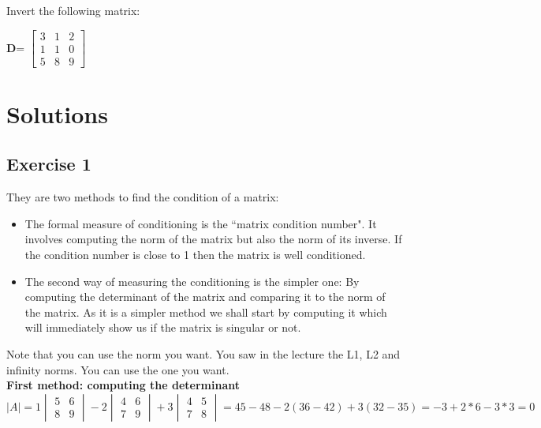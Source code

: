 \documentclass[12pt]{article}
\newenvironment{exercise}[2][Exercise]{\begin{trivlist}
\item[\hskip \labelsep {\bfseries #1}\hskip \labelsep {\bfseries #2.}]}{\end{trivlist}}
\begin{document}
\begin{exercise}{3} %
Invert the following matrix:
\begin{center}
\textbf{D}=
$\begin{bmatrix}
3&1&2\\
1&1&0\\
5&8&9
\end{bmatrix}
$
\end{center}
\end{exercise}

\break

\section{Solutions}

\subsection{Exercise 1}

They are two methods to find the condition of a matrix:
\begin{itemize}
  \item The formal measure of conditioning is the ``matrix condition number". It involves computing the norm of the matrix but also the norm of its inverse. If the condition number is close to 1 then the matrix is well conditioned.
  \item The second way of measuring the conditioning is the simpler one: By computing the determinant of the matrix and comparing it to the norm of the matrix. As it is a simpler method we shall start by computing it which will immediately show us if the matrix is singular or not.
\end{itemize}
Note that you can use the norm you want. You saw in the lecture the L1, L2 and infinity norms. You can use the one you want. \\

\textbf{First method: computing the determinant} \\

$
\vert A \vert = 1
\begin{vmatrix}
5&6 \\ 8&9
\end{vmatrix} - 2
\begin{vmatrix}
4&6 \\ 7&9
\end{vmatrix} + 3
\begin{vmatrix}
4&5 \\ 7&8
\end{vmatrix} = 45 - 48 - 2 (36-42) + 3 (32 - 35) = -3 + 2*6 - 3*3 = 0
$
\end{document}
